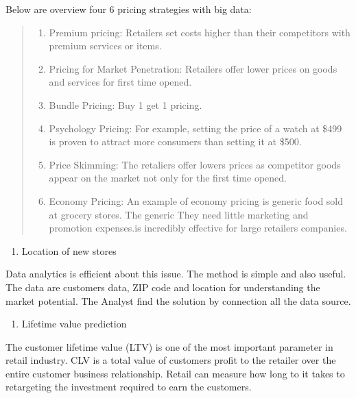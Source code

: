 \documentclass[]{book}
\providecommand{\tightlist}{%
  \setlength{\itemsep}{0pt}\setlength{\parskip}{0pt}}
\begin{document}
Below are overview four 6 pricing strategies with big data:

\begin{quote}
\begin{enumerate}
\def\labelenumi{\arabic{enumi}.}
\tightlist
\item
  Premium pricing: Retailers set costs higher than their competitors
  with premium services or items.
\item
  Pricing for Market Penetration: Retailers offer lower prices on goods
  and services for first time opened.
\item
  Bundle Pricing: Buy 1 get 1 pricing.
\item
  Psychology Pricing: For example, setting the price of a watch at \$499
  is proven to attract more consumers than setting it at \$500.
\item
  Price Skimming: The retaliers offer lowers prices as competitor goods
  appear on the market not only for the first time opened.
\item
  Economy Pricing: An example of economy pricing is generic food sold at
  grocery stores. The generic They need little marketing and promotion
  expenses.is incredibly effective for large retailers companies.
\end{enumerate}
\end{quote}

\begin{enumerate}
\def\labelenumi{\arabic{enumi}.}
\setcounter{enumi}{10}
\tightlist
\item
  Location of new stores
\end{enumerate}

Data analytics is efficient about this issue. The method is simple and
also useful. The data are customers data, ZIP code and location for
understanding the market potential. The Analyst find the solution by
connection all the data source.

\begin{enumerate}
\def\labelenumi{\arabic{enumi}.}
\setcounter{enumi}{11}
\tightlist
\item
  Lifetime value prediction
\end{enumerate}

The customer lifetime value (LTV) is one of the most important parameter
in retail industry. CLV is a total value of customers profit to the
retailer over the entire customer business relationship. Retail can
measure how long to it takes to retargeting the investment required to
earn the customers.
\end{document}
